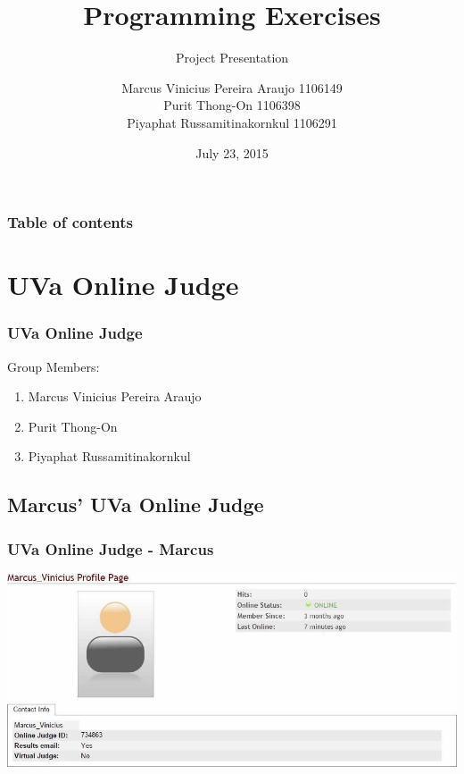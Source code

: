 \documentclass{beamer}
\title{Programming Exercises}
\subtitle{Project Presentation}
\institute{Frankfurt University of Applied Sciences}
\author{Marcus Vinicius Pereira Araujo 1106149\\Purit Thong-On 1106398\\Piyaphat Russamitinakornkul 1106291}
\date{July 23, 2015}
\begin{document}
	\begin{frame}
		\titlepage
	\end{frame} 
	
	\begin{frame}
		\frametitle{Table of contents}
		\tableofcontents
	\end{frame}
	 
	

	\section{UVa Online Judge} 
		\begin{frame}
			\sectionpage
		\end{frame}

		\begin{frame}
			\frametitle{UVa Online Judge}
			Group Members:\\
			\begin{enumerate}
				\item Marcus Vinicius Pereira Araujo
				\item Purit Thong-On
				\item Piyaphat Russamitinakornkul
			\end{enumerate} 
		\end{frame}

		\subsection{Marcus' UVa Online Judge}
			\begin{frame}
				\subsectionpage
			\end{frame}

			\begin{frame}
				\frametitle{UVa Online Judge - Marcus}
				\begin{center}
					\includegraphics[scale=0.35]{Profile2} 
				\end{center}
			\end{frame}
\end{document}
